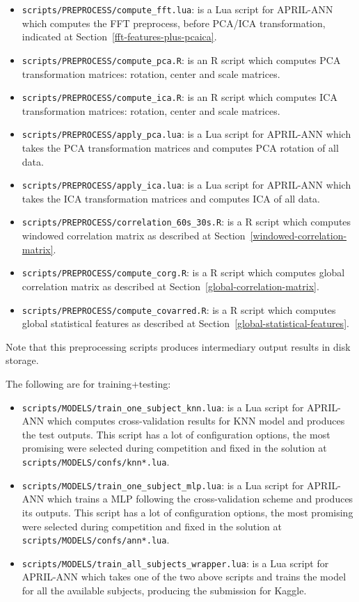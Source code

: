 \documentclass[a4paper,english,twoside]{article}
\begin{document}
\begin{itemize}
\item \verb+scripts/PREPROCESS/compute_fft.lua+: is a Lua script for APRIL-ANN
  which computes the FFT preprocess, before PCA/ICA transformation, indicated at
  Section~\ref{fft-features-plus-pcaica}.
\item \verb+scripts/PREPROCESS/compute_pca.R+: is an R script which computes
  PCA transformation matrices: rotation, center and scale matrices.
\item \verb+scripts/PREPROCESS/compute_ica.R+: is an R script which computes ICA
  transformation matrices: rotation, center and scale matrices.
\item \verb+scripts/PREPROCESS/apply_pca.lua+: is a Lua script for APRIL-ANN
  which takes the PCA transformation matrices and computes PCA rotation of all
  data.
\item \verb+scripts/PREPROCESS/apply_ica.lua+: is a Lua script for APRIL-ANN
  which takes the ICA transformation matrices and computes ICA of all data.
\item \verb+scripts/PREPROCESS/correlation_60s_30s.R+: is a R script which
  computes windowed correlation matrix as described at
  Section~\ref{windowed-correlation-matrix}.
\item \verb+scripts/PREPROCESS/compute_corg.R+: is a R script which computes
  global correlation matrix as described at
  Section~\ref{global-correlation-matrix}.
\item \verb+scripts/PREPROCESS/compute_covarred.R+: is a R script which computes
  global statistical features as described at
  Section~\ref{global-statistical-features}.
\end{itemize}

\noindent Note that this preprocessing scripts produces intermediary output
results in disk storage.

The following are for training+testing:

\begin{itemize}
\item \verb+scripts/MODELS/train_one_subject_knn.lua+: is a Lua script for
  APRIL-ANN which computes cross-validation results for KNN model and produces
  the test outputs. This script has a lot of configuration options, the most
  promising were selected during competition and fixed in the solution at
  \verb+scripts/MODELS/confs/knn*.lua+.
\item \verb+scripts/MODELS/train_one_subject_mlp.lua+: is a Lua script for
  APRIL-ANN which trains a MLP following the cross-validation scheme and
  produces its outputs. This script has a lot of configuration options, the most
  promising were selected during competition and fixed in the solution at
  \verb+scripts/MODELS/confs/ann*.lua+.
\item \verb+scripts/MODELS/train_all_subjects_wrapper.lua+: is a Lua script for
  APRIL-ANN which takes one of the two above scripts and trains the model for
  all the available subjects, producing the submission for Kaggle.
\end{itemize}
\end{document}
